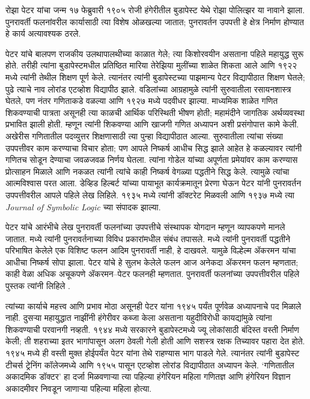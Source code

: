 \documentclass[../../../include/open-logic-section]{subfiles}
\begin{document}



रोझा पेटर यांचा जन्म १७ फेब्रुवारी १९०५ रोजी हंगेरीतील बुडापेस्ट येथे रोझा पोलित्झर या नावाने झाला. पुनरावर्ती फलनांवरील कार्यासाठी त्या विशेष ओळखल्या जातात; पुनरावर्तन उपपत्ती हे क्षेत्र निर्माण होण्यात हे कार्य अत्यावश्यक ठरले.

पेटर यांचे बालपण राजकीय उलथापालथीच्या काळात गेले; त्या किशोरवयीन असताना पहिले महायुद्ध सुरू होते. तरीही त्यांना बुडापेस्टमधील प्रतिष्ठित मारिया तेरेझिया मुलींच्या शाळेत शिकता आले आणि १९२२ मध्ये त्यांनी तेथील शिक्षण पूर्ण केले. त्यानंतर त्यांनी बुडापेस्टच्या पाझमान्य पेटर विद्यापीठात शिक्षण घेतले; पुढे त्याचे नाव लोरांड एटव्होश विद्यापीठ झाले. वडिलांच्या आग्रहामुळे त्यांनी सुरुवातीला रसायनशास्त्र घेतले, पण नंतर गणिताकडे वळल्या आणि १९२७ मध्ये पदवीधर झाल्या. माध्यमिक शाळेत गणित शिकवण्याची पात्रता असूनही त्या काळची आर्थिक परिस्थिती भीषण होती; महामंदीने जागतिक अर्थव्यवस्था प्रभावित झाली होती. म्हणून त्यांनी शिकवण्या आणि खाजगी गणित अध्यापन अशी प्रसंगोपात्त कामे केली. अखेरीस गणितातील पदव्युत्तर शिक्षणासाठी त्या पुन्हा विद्यापीठात आल्या. सुरुवातीला त्यांचा संख्या उपपत्तीवर काम करण्याचा विचार होता; पण आपले निष्कर्ष आधीच सिद्ध झाले आहेत हे कळल्यावर त्यांनी गणितच सोडून देण्याचा जवळजवळ निर्णय घेतला. त्यांना गोडेल यांच्या अपूर्णता प्रमेयांवर काम करण्यास प्रोत्साहन मिळाले आणि नकळत त्यांनी त्यांचे काही निष्कर्ष वेगळ्या पद्धतीने सिद्ध केले. त्यामुळे त्यांचा आत्मविश्वास परत आला. डेव्हिड हिल्बर्ट यांच्या पायाभूत कार्यक्रमातून प्रेरणा घेऊन पेटर यांनी पुनरावर्तन उपपत्तीवरील आपले पहिले लेख लिहिले. १९३५ मध्ये त्यांनी डॉक्टरेट मिळवली आणि १९३७ मध्ये त्या \emph{Journal of
  Symbolic Logic} च्या संपादक झाल्या.

पेटर यांचे आरंभीचे लेख पुनरावर्ती फलनांच्या उपपत्तीचे संस्थापक योगदान म्हणून व्यापकपणे मानले जातात. \cite{Peter1935a} मध्ये त्यांनी पुनरावर्तनाच्या विविध प्रकारांमधील संबंध तपासले. \cite{Peter1935b} मध्ये त्यांनी पुनरावर्ती पद्धतीने परिभाषित केलेले एक विशिष्ट फलन आदिम पुनरावर्ती नाही, हे दाखवले. यामुळे विल्हेल्म ॲकरमन यांचा आधीचा निष्कर्ष सोपा झाला. पेटर यांचे हे सुलभ केलेले फलन आज अनेकदा ॲकरमन फलन म्हणतात; काही वेळा अधिक अचूकपणे ॲकरमन–पेटर फलनही म्हणतात. पुनरावर्ती फलनांच्या उपपत्तीवरील पहिले पुस्तक त्यांनी लिहिले \citep{Peter1951}.

त्यांच्या कार्याचे महत्त्व आणि प्रभाव मोठा असूनही पेटर यांना १९४५ पर्यंत पूर्णवेळ अध्यापनाचे पद मिळाले नाही. दुसऱ्या महायुद्धात नाझींनी हंगेरीवर कब्जा केला असताना यहुदीविरोधी कायद्यांमुळे त्यांना शिकवण्याची परवानगी नव्हती. १९४४ मध्ये सरकारने बुडापेस्टमध्ये ज्यू लोकांसाठी बंदिस्त वस्ती निर्माण केली; ती शहराच्या इतर भागांपासून अलग ठेवली गेली होती आणि सशस्त्र रक्षक तिच्यावर पहारा देत होते. १९४५ मध्ये ही वस्ती मुक्त होईपर्यंत पेटर यांना तेथे राहण्यास भाग पाडले गेले. त्यानंतर त्यांनी बुडापेस्ट टीचर्स ट्रेनिंग कॉलेजमध्ये आणि १९५५ पासून एटव्होश लोरांड विद्यापीठात अध्यापन केले. ‘गणितातील अकादमिक डॉक्टर’ हा दर्जा मिळवणाऱ्या त्या पहिल्या हंगेरियन महिला गणितज्ञ आणि हंगेरियन विज्ञान अकादमीवर निवडून जाणाऱ्या पहिल्या महिला होत्या.
\end{document}

